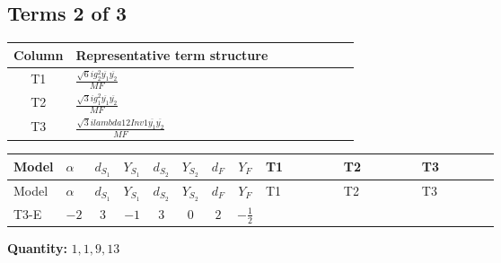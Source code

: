 \documentclass[8pt]{article}
\begin{document}
\begin{landscape}
\subsection*{Terms 2 of 3}
\begin{center}
\begin{tabular}{@{}c >{\raggedright\arraybackslash}p{0.82\linewidth}@{}}
\toprule
Column & Representative term structure \\
\midrule
T1 & \(\displaystyle \frac{\sqrt{6} i g_{2}^{2} \overline{y_{1}} \overline{y_{2}}}{MF}\) \\
\midrule
T2 & \(\displaystyle \frac{\sqrt{3} i g_{1}^{2} \overline{y_{1}} \overline{y_{2}}}{MF}\) \\
\midrule
T3 & \(\displaystyle \frac{\sqrt{3} i lambda12Inv1 \overline{y_{1}} \overline{y_{2}}}{MF}\) \\
\midrule
\bottomrule
\end{tabular}
\end{center}
\smallskip
\tiny
\begin{longtable}{@{}llcccccc >{\raggedright\arraybackslash}p{0.21\linewidth} >{\raggedright\arraybackslash}p{0.21\linewidth} >{\raggedright\arraybackslash}p{0.21\linewidth}@{}}
\toprule
Model & $\alpha$ & $d_{S_1}$ & $Y_{S_1}$ & $d_{S_2}$ & $Y_{S_2}$ & $d_F$ & $Y_F$ & T1 & T2 & T3 \\
\midrule
\endfirsthead
\toprule
Model & $\alpha$ & $d_{S_1}$ & $Y_{S_1}$ & $d_{S_2}$ & $Y_{S_2}$ & $d_F$ & $Y_F$ & T1 & T2 & T3 \\
\midrule
\endhead
T3-E & $-2$ & $3$ & $-1$ & $3$ & $0$ & $2$ & $-\frac{1}{2}$ & \scriptsize\adjustbox{max width=\linewidth}{$\begin{gathered} - \frac{\sqrt{6} i g_{2}^{2} \overline{y_{1}} \overline{y_{2}}}{3 MF}\end{gathered}$} & \scriptsize\adjustbox{max width=\linewidth}{$\begin{gathered} - \frac{\sqrt{3} i g_{1}^{2} \overline{y_{1}} \overline{y_{2}}}{8 MF}\end{gathered}$} & \scriptsize\adjustbox{max width=\linewidth}{$\begin{gathered} \frac{\sqrt{3} i lambda12Inv1 \overline{y_{1}} \overline{y_{2}}}{6 MF}\end{gathered}$} \\
\midrule
\bottomrule
\end{longtable}
\clearpage
\noindent\textbf{Quantity: }$\mathrm{1,1,9,13}$\par\smallskip

\end{landscape}
\end{document}
